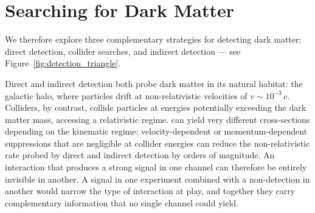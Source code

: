 
\section{Searching for Dark Matter}
\label{sec:1.3}

We therefore explore three complementary strategies for detecting dark matter: direct detection, collider searches, and indirect detection --- see Figure~\ref{fig:detection_triangle}.

Direct and indirect detection both probe dark matter in its natural habitat: the galactic halo, where particles drift at non-relativistic velocities of $v \sim 10^{-3}\,c$.
Colliders, by contrast, collide particles at energies potentially exceeding the dark matter mass, accessing a relativistic regime.
 can yield very different cross-sections depending on the kinematic regime: velocity-dependent or momentum-dependent suppressions that are negligible at collider energies can reduce the non-relativistic rate probed by direct and indirect detection by orders of magnitude.
An interaction that produces a strong signal in one channel can therefore be entirely invisible in another.
A signal in one experiment combined with a non-detection in another would narrow the type of interaction at play, and together they carry complementary information that no single channel could yield.


